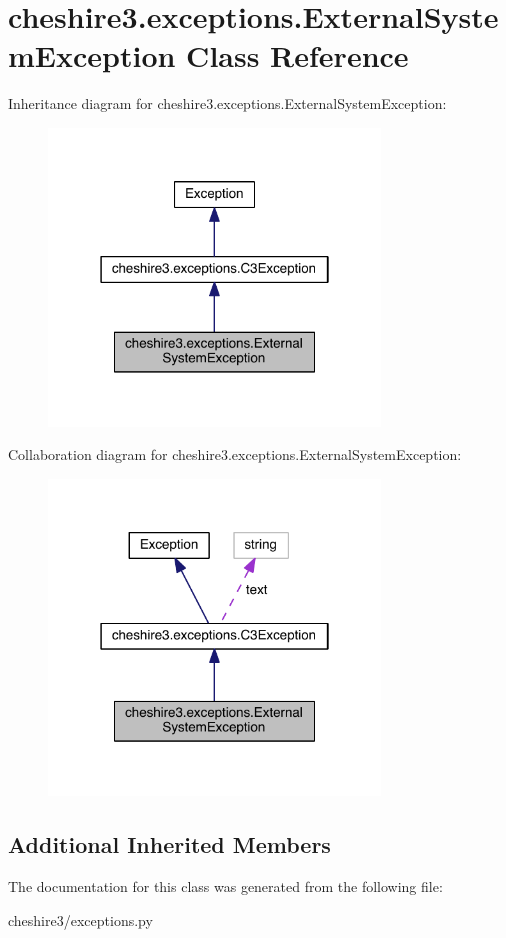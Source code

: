\hypertarget{classcheshire3_1_1exceptions_1_1_external_system_exception}{\section{cheshire3.\-exceptions.\-External\-System\-Exception Class Reference}
\label{classcheshire3_1_1exceptions_1_1_external_system_exception}
}


Inheritance diagram for cheshire3.\-exceptions.\-External\-System\-Exception\-:
\nopagebreak
\begin{figure}[H]
\begin{center}
\leavevmode
\includegraphics[width=250pt]{classcheshire3_1_1exceptions_1_1_external_system_exception__inherit__graph}
\end{center}
\end{figure}


Collaboration diagram for cheshire3.\-exceptions.\-External\-System\-Exception\-:
\nopagebreak
\begin{figure}[H]
\begin{center}
\leavevmode
\includegraphics[width=250pt]{classcheshire3_1_1exceptions_1_1_external_system_exception__coll__graph}
\end{center}
\end{figure}
\subsection*{Additional Inherited Members}


The documentation for this class was generated from the following file\-:\begin{DoxyCompactItemize}
\item 
cheshire3/exceptions.\-py\end{DoxyCompactItemize}
